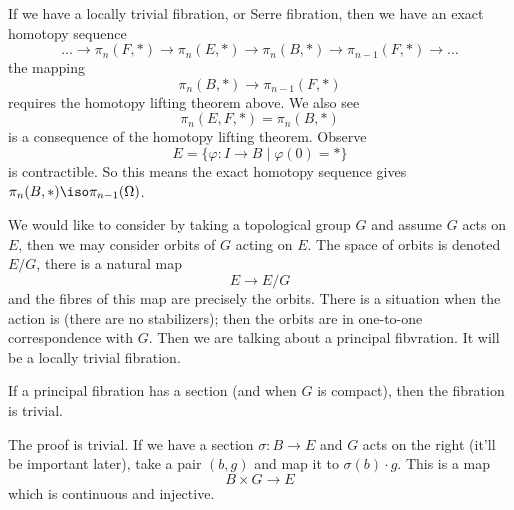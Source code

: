 If we have a locally trivial fibration, or Serre fibration, then
we have an exact homotopy sequence
\begin{equation}
\dots\to\pi_{n}(F,*)\to\pi_{n}(E,*)\to\pi_{n}(B,*)\to\pi_{n-1}(F,*)\to\dots
\end{equation}
the mapping 
\begin{equation}
\pi_{n}(B,*)\to\pi_{n-1}(F,*)
\end{equation}
requires the homotopy lifting theorem above. We also see
\begin{equation}
\pi_{n}(E,F,*)=\pi_{n}(B,*)
\end{equation}
is a consequence of the homotopy lifting theorem.
Observe
\begin{equation}
E=\{\varphi\colon I\to B\mid \varphi(0)=*\}
\end{equation}
is contractible. So this means the exact homotopy sequence gives
$\pi_{n}(B,*)\iso\pi_{n-1}(\Omega)$.

We would like to consider 
by taking a topological group $G$ and assume $G$ acts on $E$,
then we may consider orbits of $G$ acting on $E$. The space of
orbits is denoted $E/G$, there is a natural map
\begin{equation}
E\to E/G
\end{equation}
and the fibres of this map are precisely the orbits. There is a
situation when the action is 
(there are no stabilizers); then the orbits are in one-to-one
correspondence with $G$. Then we are talking about a principal
fibvration. It will be a locally trivial fibration.
\begin{prop}
If a principal fibration has a section (and when $G$ is compact),
then the fibration is trivial.
\end{prop}
The proof is trivial. If we have a section $\sigma\colon B\to E$
and $G$ acts on the right (it'll be important later), take a pair
$(b,g)$ and map it to $\sigma(b)\cdot g$. This is a map
\begin{equation}
B\times G\to E
\end{equation}
which is continuous and injective.
